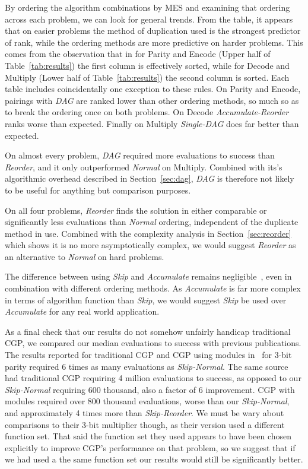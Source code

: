 \documentclass[journal]{IEEEtran}
\begin{document}
By ordering the algorithm combinations by MES and examining that ordering across each
problem, we can look for general trends.  From the table, it appears that on easier problems
the method of duplication used is the strongest predictor of rank, while
the ordering methods are more predictive on harder problems.  This comes from the
observation that in for Parity and Encode (Upper half of Table~\ref{tab:results})
the first column is effectively sorted, while for Decode and Multiply
(Lower half of Table~\ref{tab:results})
the second column is sorted.
Each table includes coincidentally one exception to these rules.  On Parity and
Encode, pairings with \emph{DAG} are ranked lower than other ordering methods, so much
so as to break the ordering once on both problems.  On Decode \emph{Accumulate-Reorder}
ranks worse than expected.  Finally on Multiply \emph{Single-DAG} does far better
than expected.

On almost every problem, \emph{DAG} required
more evaluations to success than \emph{Reorder}, and it only outperformed \emph{Normal}
on Multiply.  Combined with its's algorithmic overhead described in
Section~\ref{sec:dag}, \emph{DAG} is therefore not likely to be useful for anything
but comparison purposes.

On all four problems, \emph{Reorder} finds the solution in either comparable
or significantly less evaluations than \emph{Normal} ordering, independent of
the duplicate method in use.  Combined with the complexity analysis in
Section~\ref{sec:reorder} which shows it is no more asymptotically complex,
we would suggest \emph{Reorder} as an alternative to \emph{Normal} on hard
problems.

The difference between using \emph{Skip} and \emph{Accumulate} remains
negligible~\cite{goldman:2013:cgpwaste}, even in combination with different ordering
methods.  As \emph{Accumulate} is far more complex in terms of algorithm function
than \emph{Skip}, we would suggest \emph{Skip} be used over \emph{Accumulate} for
any real world application.

As a final check that our results do not somehow unfairly handicap traditional CGP,
we compared our median evaluations to success with previous publications.  The results
reported for traditional CGP and CGP using modules in~\cite{walker:2008:cgpmodules}
for 3-bit parity required 6 times as many evaluations as \emph{Skip-Normal}.
The same source had traditional CGP requiring 4 million evaluations to success,
as opposed to our \emph{Skip-Normal} requiring 600 thousand, also a factor of 6 improvement.
CGP with modules required over 800 thousand evaluations, worse than our \emph{Skip-Normal},
and approximately 4 times more than \emph{Skip-Reorder}.  We must be wary about comparisons
to their 3-bit multiplier though, as their version used a different function set.
That said the function set they used appears to have been chosen explicitly to improve
CGP's performance on that problem, so we suggest that if we had used a the same function
set our results would still be significantly better.
\end{document}
